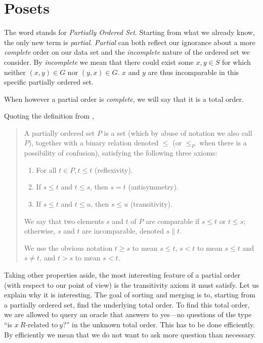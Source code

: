 \section{Posets}

The word  stands for \emph{Partially Ordered Set}. Starting from what we already know, the only new term is \emph{partial}. \emph{Partial} can both reflect our ignorance about a more \emph{complete} order on our data set and the \emph{incomplete} nature of the ordered set we consider. By \emph{incomplete} we mean that there could exist some $x, y \in S$ for which neither $(x, y) \in G$ nor $(y, x) \in G$. $x$ and $y$ are thus incomparable in this specific partially ordered set.


When however a partial order is \emph{complete}, we will say that it is a total order.

Quoting the definition from \cite{Stanley:2011:ECV:2124415},

\begin{quotation}

A partially ordered set $P$ is a set (which by abuse of notation we also call $P$), together with a binary relation denoted $\leq$ (or $\leq_P$ when there is a possibility of confusion), satisfying the following three axioms:

\begin{enumerate}
\item For all $t \in P, t \leq t$ (reflexivity).
\item If $s \leq t$ and $t \leq s$, then $s = t$ (antisymmetry).
\item If $s \leq t$ and $t \leq u$, then $s \leq u$ (transitivity).
\end{enumerate}

We say that two elements $s$ and $t$ of $P$ are comparable if $s \leq t$ or $t \leq s$; otherwise, $s$ and $t$ are incomparable, denoted $s \parallel t$.

We use the obvious notation $t \geq s$ to mean $s \leq t$, $s < t$ to mean $s \leq t$ and $s \neq t$, and $t > s$ to mean $s < t$.

\end{quotation}

Taking other properties aside, the most interesting feature of a partial order (with respect to our point of view) is the transitivity axiom it must satisfy. Let us explain why it is interesting. The goal of sorting and merging is to, starting from a partially ordered set, find the underlying total order. To find this total order, we are allowed to query an oracle that answers to yes---no questions of the type ``is $x~R\text{-related to}~y$?'' in the unknown total order. This has to be done efficiently. By efficiently we mean that we do not want to ask more question than necessary.


